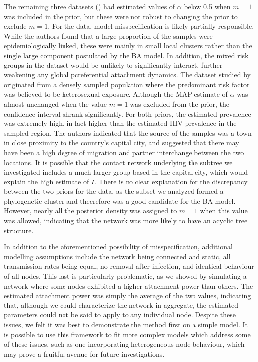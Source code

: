 \documentclass[12pt]{article}\usepackage[]{graphicx}\usepackage[]{color}
\begin{document}
The remaining three datasets (\textcite{cuevas2009hiv, novitsky2014impact,
li2015hiv}) had estimated values of $\alpha$ below 0.5 when $m = 1$ was
included in the prior, but these were not robust to changing the prior to
exclude $m = 1$. For the \citeauthor{cuevas2009hiv} data, model
misspecification is likely partially responsible. While the authors found that
a large proportion of the samples were epidemiologically linked, these were
mainly in small local clusters rather than the single large component
postulated by the BA model. In addition, the mixed risk groups in the dataset
would be unlikely to significantly interact, further weakening any global
pcreferential attachment dynamics. The dataset studied by
\textcite{novitsky2014impact} originated from a densely sampled population
where the predominant risk factor was believed to be heterosexual exposure.
Although the MAP estimate of $\alpha$ was almost unchanged when the value $m =
1$ was excluded from the prior, the confidence interval shrank significantly.
For both priors, the estimated prevalence was extremely high, in fact higher
than the estimated HIV prevalence in the sampled region. The authors indicated
that the source of the samples was a town in close proximity to the country's
capital city, and suggested that there may have been a high degree of migration
and partner interchange between the two locations. It is possible that the
contact network underlying the subtree we investigated includes a much larger
group based in the capital city, which would explain the high estimate of $I$.
There is no clear explanation for the discrepancy between the two priors for
the \textcite{li2015hiv} data, as the subset we analyzed formed a phylogenetic
cluster and thecrefore was a good candidate for the BA model. However, nearly
all the posterior density was assigned to $m = 1$ when this value was allowed,
indicating that the network was more likely to have an acyclic tree structure.

In addition to the aforementioned possibility of misspecification, additional
modelling assumptions include the network being connected and static, all
transmission rates being equal, no removal after infection, and identical
behaviour of all nodes. This last is particularly problematic, as we showed by
simulating a network where some nodes exhibited a higher attachment power than
others. The estimated attachment power was simply the average of the two
values, indicating that, although we could characterize the network in
aggregate, the estimated parameters could not be said to apply to any
individual node. Despite these issues, we felt it was best to demonstrate the
method first on a simple model. It is possible to use this framework to fit
more complex models which address some of these issues, such as one
incorporating heterogeneous node behaviour, which may prove a fruitful avenue
for future investigations.
\end{document}
